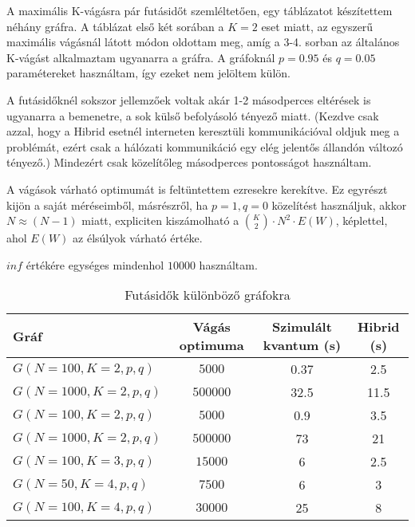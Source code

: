 A maximális K-vágásra pár futásidőt szemléltetően, egy táblázatot készítettem néhány gráfra. A táblázat első két sorában a $K=2$ eset miatt, az egyszerű maximális vágásnál látott módon oldottam meg, amíg a 3-4. sorban az általános K-vágást alkalmaztam ugyanarra a gráfra. A gráfoknál $p=0.95$ és $q=0.05$ paramétereket használtam, így ezeket nem jelöltem külön.

A futásidőknél sokszor jellemzőek voltak akár 1-2 másodperces eltérések is ugyanarra a bemenetre, a sok külső befolyásoló tényező miatt. (Kezdve csak azzal, hogy a Hibrid esetnél interneten keresztüli kommunikációval oldjuk meg a problémát, ezért csak a hálózati kommunikáció egy elég jelentős állandón változó tényező.) Mindezért csak közelítőleg másodperces pontosságot használtam.

A vágások várható optimumát is feltüntettem  ezresekre kerekítve. Ez egyrészt kijön a saját méréseimből, másrészről, ha $p=1, q=0$ közelítést használjuk, akkor $N \approx (N-1)$ miatt, expliciten kiszámolható a $\binom{K}{2} \cdot N^2 \cdot E(W)$, képlettel, ahol $E(W)$ az élsúlyok várható értéke.

$inf$ értékére egységes mindenhol $10000$ használtam.

\begin{table}[ht]
	\footnotesize
	\centering
	\begin{tabular}{ l c c c }
		\toprule
		Gráf & Vágás optimuma & Szimulált kvantum (s) & Hibrid (s) \\
		\midrule
		$G(N=100, K=2, p, q)$ & $5000$ & 0.37 & 2.5   \\
		$G(N=1000, K=2, p, q)$ & $500000$ & 32.5 & 11.5 \\
		$G(N=100, K=2, p, q)$ & $5000$ & 0.9 & 3.5  \\
		$G(N=1000, K=2, p, q)$ & $500000$ & 73 & 21 \\	
		$G(N=100, K=3, p, q)$ & $15000$ & 6 & 2.5 \\		
		$G(N=50, K=4, p, q)$ & $7500$ & 6 & 3 \\		
		$G(N=100, K=4, p, q)$ & $30000$ & 25 & 8 \\

		\bottomrule
	\end{tabular}
	\caption{Futásidők különböző gráfokra}
	\label{tab:TabularExample}
\end{table}

